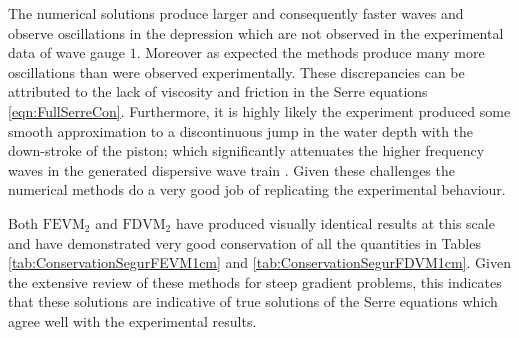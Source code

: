 The numerical solutions produce larger and consequently faster waves and observe oscillations in the depression which are not observed in the experimental data of wave gauge $1$. Moreover as expected the methods produce many more oscillations than were observed experimentally. These discrepancies can be attributed to the lack of viscosity and friction in the Serre equations \eqref{eqn:FullSerreCon}. Furthermore, it is highly likely the experiment produced some smooth approximation to a discontinuous jump in the water depth with the down-stroke of the piston; which significantly attenuates the higher frequency waves in the generated dispersive wave train \cite{Pitt-2018-61}. Given these challenges the numerical methods do a very good job of replicating the experimental behaviour. 

Both $\text{FEVM}_2$ and $\text{FDVM}_2$ have produced visually identical results at this scale and have demonstrated very good conservation of all the quantities in Tables \ref{tab:ConservationSegurFEVM1cm} and \ref{tab:ConservationSegurFDVM1cm}. Given the extensive review of these methods \cite{Pitt-2018-61} for steep gradient problems, this indicates that these solutions are indicative of true solutions of the Serre equations which agree well with the experimental results.

